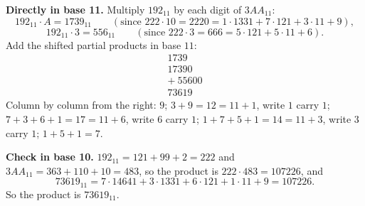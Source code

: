 \textbf{Directly in base 11.} Multiply $192_{11}$ by each digit of $3AA_{11}$:
\[192_{11}\cdot A=1739_{11}\qquad(\text{since }222\cdot10=2220=1\cdot1331+7\cdot121+3\cdot11+9),\]
\[192_{11}\cdot3=556_{11}\qquad(\text{since }222\cdot3=666=5\cdot121+5\cdot11+6).\]
Add the shifted partial products in base $11$:
\[\begin{array}{r}1739\\17390\\+\ 55600\\\hline73619\end{array}\]
Column by column from the right: $9$; $3+9=12=11+1$, write $1$ carry $1$; $7+3+6+1=17=11+6$, write $6$ carry $1$; $1+7+5+1=14=11+3$, write $3$ carry $1$; $1+5+1=7$.

\textbf{Check in base 10.} $192_{11}=121+99+2=222$ and $3AA_{11}=363+110+10=483$, so the product is $222\cdot483=107226$, and
\[73619_{11}=7\cdot14641+3\cdot1331+6\cdot121+1\cdot11+9=107226 .\]
So the product is $\boxed{73619_{11}}$.
